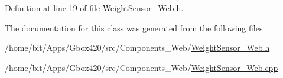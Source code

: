 Definition at line 19 of file Weight\+Sensor\+\_\+\+Web.\+h.



The documentation for this class was generated from the following files\+:\begin{DoxyCompactItemize}
\item 
/home/bit/\+Apps/\+Gbox420/src/\+Components\+\_\+\+Web/\hyperlink{_weight_sensor___web_8h}{Weight\+Sensor\+\_\+\+Web.\+h}\item 
/home/bit/\+Apps/\+Gbox420/src/\+Components\+\_\+\+Web/\hyperlink{_weight_sensor___web_8cpp}{Weight\+Sensor\+\_\+\+Web.\+cpp}\end{DoxyCompactItemize}

